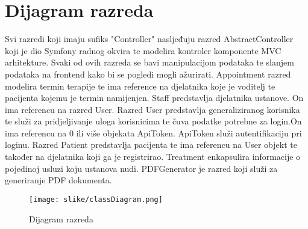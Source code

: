 			
		\section{Dijagram razreda}
		
			
			
			\begin{comment}
				content...	\textit{Prilikom prve predaje projekta, potrebno je priložiti potpuno razrađen dijagram razreda vezan uz \textbf{generičku funkcionalnost} sustava. Ostale funkcionalnosti trebaju biti idejno razrađene u dijagramu sa sljedećim komponentama: nazivi razreda, nazivi metoda i vrste pristupa metodama (npr. javni, zaštićeni), nazivi atributa razreda, veze i odnosi između razreda.}\\
			\end{comment}
			Svi razredi koji imaju sufiks "Controller" nasljeđuju razred AbstractController koji je dio Symfony radnog okvira te modelira kontroler komponente MVC arhitekture. Svaki od ovih razreda se bavi manipulacijom podataka te slanjem podataka na frontend kako bi se pogledi mogli ažurirati.
			Appointment razred modelira termin terapije te ima reference na djelatnika koje je voditelj te pacijenta kojemu je termin namijenjen. Staff predstavlja djelatnika ustanove. On ima referencu na razred User. Razred User predstavlja generaliziranog korisnika te služi za pridjeljivanje uloga korisnicima te čuva podatke potrebne za login.On ima referencu na 0 ili više objekata ApiToken.
			ApiToken služi autentifikaciju pri loginu. Razred Patient predstavlja pacijenta te ima referencu na User objekt te također na djelatnika koji ga je registrirao. Treatment enkapsulira informacije o pojedinoj usluzi koju ustanova nudi. PDFGenerator je razred koji služi za generiranje PDF dokumenta.
		
		
		
				\begin{figure}[H]
				\texttt{[image: slike/classDiagram.png]} %
				\centering
				\caption{Dijagram razreda}
				\label{fig:classDiagram}
				\end{figure}
			
